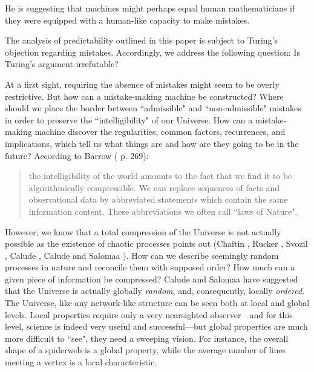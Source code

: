 He is suggesting that machines might perhaps equal human mathematicians if
they were equipped
with a human-like capacity to make mistakes.

The   analysis of predictability outlined in this paper
 is subject to Turing's objection regarding mistakes. Accordingly,  we
address the
following  question:
Is Turing's argument irrefutable?


 At a first sight,  requiring the absence of  mistakes
might seem to be  overly  restrictive.
But how can a mistake-making machine  be constructed?
 Where should we place the border between
``admissible"
and ``non-admissible" mistakes in order to preserve  the ``intelligibility"
of our Universe.
How can a mistake-making machine
discover the regularities, common factors, recurrences, and  implications,
which tell us
what  things are and how are they going to be in the future?
According to Barrow
(\cite{barrow} p. 269):

\begin{quote}
 the intelligibility of the world amounts to the fact that we find it to be
algorithmically compressible.  We can replace sequences of facts and
observational data by
abbreviated statements which contain the same information content. These
abbreviations we often call ``laws of Nature".
\end{quote}

However, we know that a total compression of the Universe is not
actually possible as the
existence of chaotic processes points out (Chaitin \cite{ch8,ch9},
Rucker \cite{rucker1},  Svozil \cite{svozil,svozil1,svozil2},
Calude \cite{cris}, Calude and Salomaa \cite{caludesalomaa}). How can we
describe  seemingly random processes in nature and reconcile them with
supposed order? How much can a given piece of information be compressed?
 Calude and Salomaa \cite{caludesalomaa} have suggested that the Universe
is actually globally
{\it random}, and, consequently, locally  {\it ordered}. The Universe, like
any network-like structure can
be seen both at  local  and  global levels. Local properties require only a
very nearsighted
observer---and for this level, science is indeed very useful and
successful---but global properties
are much  more difficult to ``see", they
need a sweeping vision. For instance, the overall shape of a
spiderweb is a global property, while the average  number of lines meeting
a vertex is
a local characteristic.



